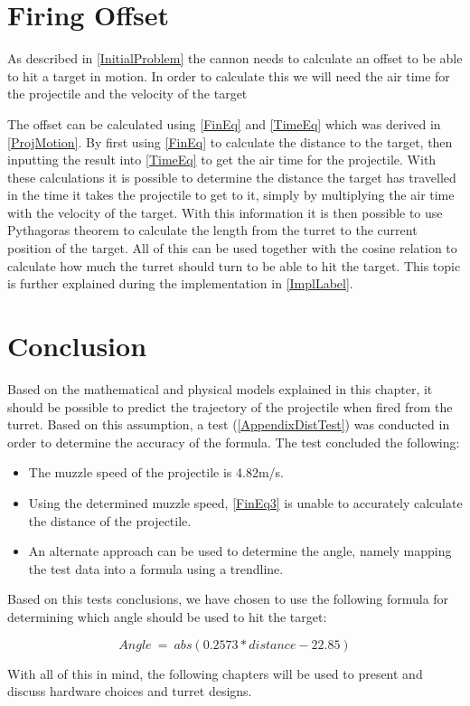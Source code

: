 \section{Firing Offset}
As described in \autoref{InitialProblem} the cannon needs to calculate an
offset to be able to hit a target in motion. In order to calculate this we will
need the air time for the projectile and the velocity of the target\nl

The offset can be calculated using \autoref{FinEq} and \autoref{TimeEq} which
was derived in \autoref{ProjMotion}. By first using \autoref{FinEq} to
calculate the distance to the target, then inputting the result into
\autoref{TimeEq} to get the air time for the projectile. With these calculations
it is possible to determine the distance the target has travelled in the time it
takes the projectile to get to it, simply by multiplying the air time with the
velocity of the target. With this information it is then possible to use
Pythagoras theorem to calculate the length from the turret to the current
position of the target. All of this can be used together with the
cosine relation to calculate how much the turret should turn to be able to hit
the target. This topic is further explained during the implementation in
\autoref{ImplLabel}.

\section{Conclusion}
Based on the mathematical and physical models explained in this chapter, it
should be possible to predict the trajectory of the projectile when fired from
the turret. Based on this assumption, a test (\autoref{AppendixDistTest}) was
conducted in order to determine the accuracy of the formula. The test concluded
the following:
\begin{itemize}
  \item The muzzle speed of the projectile is 4.82m/s.
  \item Using the determined muzzle speed, \autoref{FinEq3} is unable to
  accurately calculate the distance of the projectile.
  \item An alternate approach can be used to determine the angle, namely mapping
  the test data into a formula using a trendline.  
\end{itemize}

Based on this tests conclusions, we have chosen to use the following formula for
determining which angle should be used to hit the target:

\begin{equation}\label{angleCalc}
Angle\ =\ abs(0.2573 * distance - 22.85)
\end{equation}


With all of this in mind, the following chapters will be used to present
and discuss hardware choices and turret designs.
